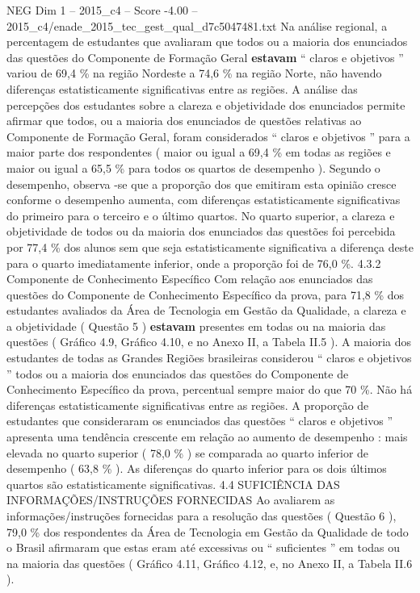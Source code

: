 \begin{textsample}{NEG Dim 1 – 2015\_c4 – Score -4.00 – 2015\_c4/enade\_2015\_tec\_gest\_qual\_d7c5047481.txt}
Na análise regional, a percentagem de estudantes que avaliaram que todos ou a maioria dos enunciados das questões do Componente de Formação Geral \textbf{estavam} “ claros e objetivos ” variou de 69,4 \% na região Nordeste a 74,6 \% na região Norte, não havendo diferenças estatisticamente significativas entre as regiões.
A análise das percepções dos estudantes sobre a clareza e objetividade dos enunciados permite afirmar que todos, ou a maioria dos enunciados de questões relativas ao Componente de Formação Geral, foram considerados “ claros e objetivos ” para a maior parte dos respondentes ( maior ou igual a 69,4 \% em todas as regiões e maior ou igual a 65,5 \% para todos os quartos de desempenho ).
Segundo o desempenho, observa -se que a proporção dos que emitiram esta opinião cresce conforme o desempenho aumenta, com diferenças estatisticamente significativas do primeiro para o terceiro e o último quartos.
No quarto superior, a clareza e objetividade de todos ou da maioria dos enunciados das questões foi percebida por 77,4 \% dos alunos sem que seja estatisticamente significativa a diferença deste para o quarto imediatamente inferior, onde a proporção foi de 76,0 \%. 4.3.2 Componente de Conhecimento Específico Com relação aos enunciados das questões do Componente de Conhecimento Específico da prova, para 71,8 \% dos estudantes avaliados da Área de Tecnologia em Gestão da Qualidade, a clareza e a objetividade ( Questão 5 ) \textbf{estavam} presentes em todas ou na maioria das questões ( Gráfico 4.9, Gráfico 4.10, e no Anexo II, a Tabela II.5 ).
A maioria dos estudantes de todas as Grandes Regiões brasileiras considerou “ claros e objetivos ” todos ou a maioria dos enunciados das questões do Componente de Conhecimento Específico da prova, percentual sempre maior do que 70 \%.
Não há diferenças estatisticamente significativas entre as regiões.
A proporção de estudantes que consideraram os enunciados das questões “ claros e objetivos ” apresenta uma tendência crescente em relação ao aumento de desempenho : mais elevada no quarto superior ( 78,0 \% ) se comparada ao quarto inferior de desempenho ( 63,8 \% ).
As diferenças do quarto inferior para os dois últimos quartos são estatisticamente significativas. 4.4 SUFICIÊNCIA DAS INFORMAÇÕES/INSTRUÇÕES FORNECIDAS Ao avaliarem as informações/instruções fornecidas para a resolução das questões ( Questão 6 ), 79,0 \% dos respondentes da Área de Tecnologia em Gestão da Qualidade de todo o Brasil afirmaram que estas eram até excessivas ou “ suficientes ” em todas ou na maioria das questões ( Gráfico 4.11, Gráfico 4.12, e, no Anexo II, a Tabela II.6 ).

\end{textsample}
